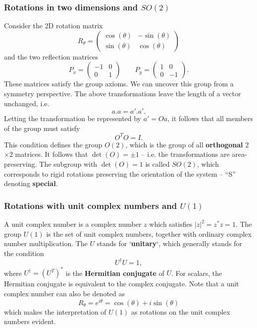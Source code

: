 \documentclass[11pt]{article}
\numberwithin{equation}{section}
\begin{document}
\subsubsection{Rotations in two dimensions and $SO(2)$}
Consider the 2D rotation matrix 
\begin{equation}
R_\theta = \begin{pmatrix}
\cos(\theta)& -\sin(\theta)\\
\sin(\theta)& \cos(\theta)
\end{pmatrix} \label{eq:2d-rotation-matrix}
\end{equation}
and the two reflection matrices
\begin{equation}
P_x = \begin{pmatrix}
-1& 0\\
0& 1
\end{pmatrix} \qquad 
P_y = \begin{pmatrix}
1& 0\\
0& -1
\end{pmatrix}.
\end{equation}
These matrices satisfy the group axioms. We can uncover this group from a symmetry perspective. The above transformations leave the length of a vector unchanged, i.e.
\begin{equation}
a.a = a'.a'.
\end{equation}
Letting the transformation be represented by $a' = Oa$, it follows that all members of the group must satisfy
\begin{equation}
O^T O = I.
\end{equation}
This condition defines the group $O(2)$, which is the group of all \textbf{orthogonal} 2$\times$2 matrices. It follows that $\det(O)=\pm 1$ -- i.e. the transformations are area-preserving. The subgroup with $\det(O)=1$ is called $SO(2)$, which corresponds to rigid rotations preserving the orientation of the system -- ``S'' denoting \textbf{special}. 

\subsubsection{Rotations with unit complex numbers and $U(1)$}
A unit complex number is a complex number $z$ which satisfies $|z|^2=z^*z=1$. The group $U(1)$ is the set of unit complex numbers, together with ordinary complex number multiplication. The $U$ stands for `\textbf{unitary}`, which generally stands for the condition 
\begin{equation}
U^\dagger U=1,
\end{equation} 
where $U^\dagger = (U^{T})^*$ is the \textbf{Hermitian conjugate} of $U$. For scalars, the Hermitian conjugate is equivalent to the complex conjugate. Note that a unit complex number can also be denoted as 
\begin{equation}
R_\theta = e^{i\theta} = \cos(\theta) + i \sin(\theta)
\end{equation}
which makes the interpretation of $U(1)$ as rotations on the unit complex numbers evident.
\end{document}
